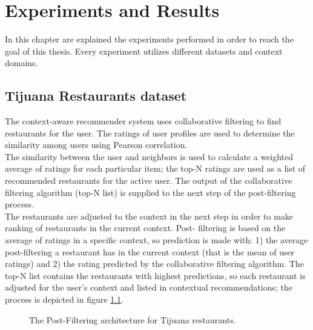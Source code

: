 \chapter{Experiments and Results} \label{sec:4}


In this chapter are explained the experiments performed in order to
reach the goal of this thesis.  Every experiment utilizes different
datasets and context domains.

\section{Tijuana Restaurants dataset} 

The context-aware recommender system  
uses collaborative filtering to find restaurants for the
user\cite{ramirez2013restaurant}. The ratings of user profiles are
used to determine the similarity among users using Pearson correlation. \\   
The similarity between the user and  neighbors is used to calculate a
weighted average of ratings for each particular item;  the top-N
ratings are used as a list of recommended restaurants for the active
user. The output of the collaborative filtering algorithm (top-N list)
is supplied to the next step of the post-filtering process. \\   The
restaurants are adjusted to the context in the next step in order to
make ranking of restaurants in the current context. Post- filtering is
based on the average of ratings in a specific context, so prediction
is made with: 1) the average post-filtering a restaurant has in the
current context (that is the mean of user ratings) and 2) the rating
predicted by the collaborative filtering algorithm. The top-N list
contains the restaurants with highest predictions, so each restaurant
is adjusted for the user’s context and listed in contextual
recommendations; the process is depicted in figure
\ref{fig:postfiltering}.
\begin{figure}
\centering
\setlength\fboxsep{0pt}
\caption{The Post-Filtering architecture for Tijuana restaurants.}
\label{fig:postfiltering}     
\end{figure}

